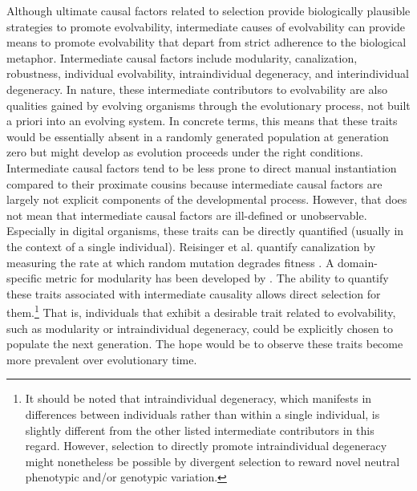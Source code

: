 Although ultimate causal factors related to selection provide biologically plausible strategies to promote evolvability, intermediate causes of evolvability can provide means to promote evolvability that depart from strict adherence to the biological metaphor.
Intermediate causal factors include modularity, canalization, robustness, individual evolvability, intraindividual degeneracy, and interindividual degeneracy.
In nature, these intermediate contributors to evolvability are also qualities gained by evolving organisms through the evolutionary process, not built a priori into an evolving system.
In concrete terms, this means that these traits would be essentially absent in a randomly generated population at generation zero but might develop as evolution proceeds under the right conditions.
Intermediate causal factors tend to be less prone to direct manual instantiation compared to their proximate cousins because intermediate causal factors are largely not explicit components of the developmental process.
However, that does not mean that intermediate causal factors are ill-defined or unobservable.
Especially in digital organisms, these traits can be directly quantified (usually in the context of a single individual).
Reisinger et al. quantify canalization by measuring the rate at which random mutation degrades fitness \cite{Reisinger2007AcquiringRepresentations}.
A domain-specific metric for modularity has been developed by \cite{Kashtan2005SpontaneousMotifs}.
The ability to quantify these traits associated with intermediate causality allows direct selection for them.\footnote
{It should be noted that intraindividual degeneracy, which manifests in differences between individuals rather than within a single individual, is slightly different from the other listed intermediate contributors in this regard.
However, selection to directly promote intraindividual degeneracy might nonetheless be possible by divergent selection to reward novel neutral phenotypic and/or genotypic variation.}
That is, individuals that exhibit a desirable trait related to evolvability, such as modularity or intraindividual degeneracy, could be explicitly chosen to populate the next generation. The hope would be to observe these traits become more prevalent over evolutionary time.

